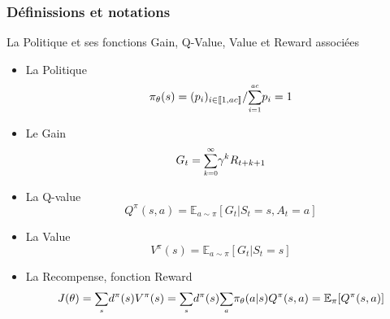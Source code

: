 \documentclass[8pt]{beamer}
\begin{document}
\begin{frame}

  \frametitle{Définissions et notations}

  \begin{block}{La Politique et ses fonctions Gain, Q-Value, Value et Reward associées}
    \begin{itemize}
    \item La Politique
      \begin{equation} \pi_{\theta}(s) = (p_i)_{i \in \llbracket 1, ac \rrbracket} / {\scalebox{0.85}{$\displaystyle \sum_{i = 1}^{ac}$}}p_i = 1  \end{equation}
    \item Le Gain
      \begin{equation} G_t = {\scalebox{0.85}{$\displaystyle \sum_{k=0}^{\infty}$}} \gamma^k R_{t+k+1} \end{equation}
    \item La Q-value
      \begin{equation} Q^\pi(s, a) = \mathbb{E}_{a\sim \pi} [G_t \vert S_t = s, A_t = a] \end{equation}
    \item La Value
      \begin{equation} V^\pi (s) = \mathbb{E}_{a\sim \pi} [G_t \vert S_t = s] \end{equation}
    \item La Recompense, fonction Reward
      \begin{equation} J(\theta) 
= {\scalebox{0.85}{$\displaystyle \sum_{s}$}} d^\pi(s) V^\pi(s) 
= {\scalebox{0.85}{$\displaystyle \sum_{s}$}} d^\pi(s) {\scalebox{0.85}{$\displaystyle  \sum_{a}$}} \pi_\theta(a \vert s) Q^\pi(s, a)
= \mathbb{E}_{\pi} [Q^{\pi}(s,a)] \end{equation}
    \end{itemize}
  \end{block}
  
\end{frame}
\end{document}
